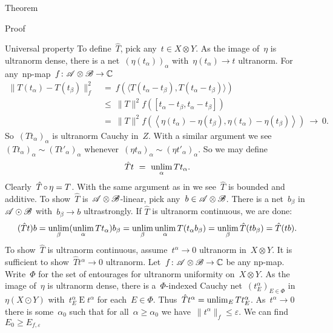 \documentclass[b]{subfiles}
\begin{document}
\begin{parsec}
\begin{point}{Theorem}
\begin{point}{Proof}
\begin{point}{Universal property}
To define~$\hat{T}$, pick any~$t \in X \otimes Y$.
As the image of~$\eta$ is ultranorm dense,
there is a net~$(\eta(t_\alpha))_\alpha$ with~$\eta(t_\alpha) \to t$ ultranorm.
For any~np-map~$f\colon \mathscr{A}\otimes \mathscr{B} \to \mathbb{C}$
\begin{align*}
    \|T(t_\alpha) - T(t_\beta) \|_f^2 
        &\ =\ f(\langle T(t_\alpha - t_\beta), T(t_\alpha - t_\beta) \rangle) \\
        & \ \leq \ \|T\|^2 f([t_\alpha-t_\beta, t_\alpha - t_\beta]) \\
        & \ = \ \|T\|^2 f(\left<\eta (t_\alpha)-\eta(t_\beta), \eta(t_\alpha) - \eta(t_\beta)\right>) \ \to\  0.
\end{align*}
So~$(T t_\alpha)_\alpha$ is ultranorm Cauchy in~$Z$.
With a similar argument we see~$(Tt_\alpha)_\alpha \sim (T t'_\alpha)_\alpha$
whenever~$(\eta t_\alpha)_\alpha \sim (\eta t'_\alpha)_\alpha$.
So we may define
\begin{equation*}
\hat{T} t \ = \ \unlim_\alpha T t_\alpha.
\end{equation*}
Clearly~$\hat{T} \mathop{\circ} \eta = T$.
With the same argument as in 
    we see~$\hat{T}$ is bounded and additive.
To show~$\hat{T}$ is~$\mathscr{A}\otimes \mathscr{B}$-linear,
    pick any~$b \in \mathscr{A} \otimes \mathscr{B}$.
There is a net~$b_\beta$ in~$\mathscr{A} \odot \mathscr{B}$
    with~$b_\beta \to b$ ultrastrongly.
If $\hat{T}$ is ultranorm continuous, we are done:
\begin{equation*}
    (\hat{T} t) b
    = \unlim_\beta (\unlim_\alpha T t_\alpha) b_\beta\\
     = \unlim_\beta \unlim_\alpha T (t_\alpha b_\beta) \\
     = \unlim_\beta \hat{T} (t b_\beta)\\
     = \hat{T} (tb).
\end{equation*}
To show~$\hat{T}$ is ultranorm continuous,
    assume~$t^\alpha \to 0$ ultranorm in~$X \otimes Y$.
It is sufficient to show~$\hat{T} t^\alpha \to 0$ ultranorm.
Let~$f\colon \mathscr{A}\otimes \mathscr{B} \to \mathbb{C}$ be any np-map.
Write~$\Phi$ for the set of entourages for ultranorm uniformity
    on~$X \otimes Y$.
As the image of~$\eta$ is ultranorm dense,
there is a~$\Phi$-indexed Cauchy net~$(t^\alpha_E)_{E \in \Phi}$ in
    $\eta (X \odot Y)$
    with~$t^\alpha_E \mathrel{E} t^\alpha$
    for each~$E \in \Phi$.
Thus~$\hat{T} t^\alpha = \unlim_E T t^\alpha_E$.
As~$t^\alpha \to 0$
    there is some~$\alpha_0$
    such that for all~$\alpha \geq \alpha_0$
    we have~$\|t^\alpha \|_f \leq \varepsilon$.
We can find~$E_0 \geq E_{f,\varepsilon}$

\end{point}
\end{point}
\end{point}
\end{parsec}
\end{document}
